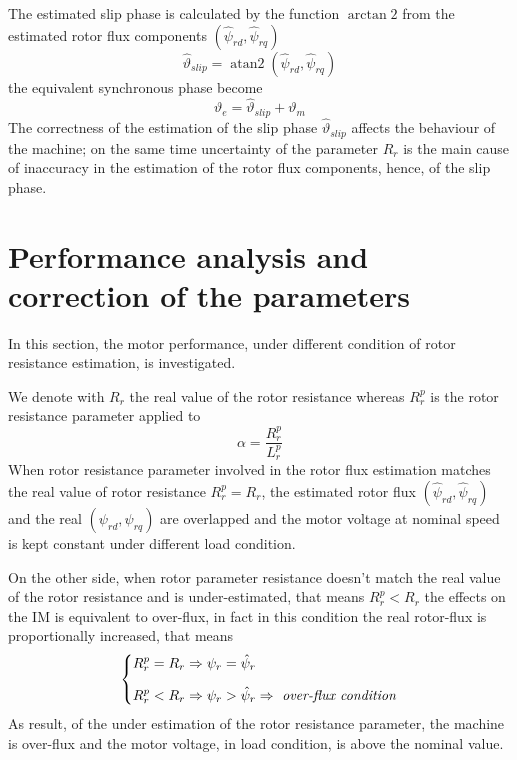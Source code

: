 \documentclass[11pt,a4paper,oneside]{book}
\numberwithin{equation}{section}
\DeclareMathOperator{\atantwo}{atan2}
\theoremstyle{it}
\theoremstyle{definition}
\begin{document}
The estimated slip phase is calculated by the function $\arctan2$ from the estimated rotor flux components $(\hat{\psi}_{rd}, \hat{\psi}_{rq})$
\begin{equation}\label{eq62}
	\hat{\vartheta}_{slip}=\atantwo(\hat{\psi}_{rd}, \hat{\psi}_{rq})
\end{equation}
the equivalent synchronous phase become 
\begin{equation}\label{eq63}
	\vartheta_{e}=\hat{\vartheta}_{slip}+\vartheta_{m}
\end{equation}
The correctness of the estimation of the slip phase $\hat{\vartheta}_{slip}$ affects the  behaviour of the machine; on the same time uncertainty of the parameter $R_r$ is the main cause of inaccuracy in the estimation of the rotor flux components, hence, of the slip phase. 


\section{Performance analysis and correction of the parameters}
In this section, the motor performance, under different condition of rotor resistance estimation, is investigated.

We denote with $R_r$ the real value of the rotor resistance whereas $R_r^p$ is the rotor resistance parameter applied to 
\begin{equation}\label{eq64}
	\alpha = \frac{R_r^p}{L_r^p}
\end{equation}
When rotor resistance parameter involved in the rotor flux estimation matches the real value of rotor resistance $R_r^p = R_r$, the estimated rotor flux $(\hat{\psi}_{rd}, \hat{\psi}_{rq})$ and the real $({\psi}_{rd}, {\psi}_{rq})$ are overlapped and the motor voltage at nominal speed is kept constant under different load condition. 

On the other side, when rotor parameter resistance doesn't match the real value of the rotor resistance and is under-estimated, that means $R_r^p < R_r$ the effects on the IM is equivalent to over-flux, in fact in this condition the real rotor-flux is proportionally increased, that means 
\begin{equation}\label{eq65}
	\left\{
	\begin{split} 
		R_r^p & = R_r  \Rightarrow \psi_r = \hat{\psi}_{r}  \\[6pt]
		R_r^p & < R_r  \Rightarrow \psi_r > \hat{\psi}_{r}  \Rightarrow \textrm{ \textit{over-flux condition}}
	\end{split}
	\right.
\end{equation}
As result, of the under estimation of the rotor resistance parameter, the machine is over-flux and the motor voltage, in load condition, is above the nominal value.
\end{document}

